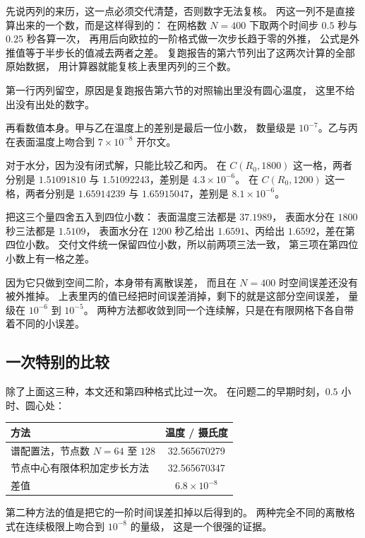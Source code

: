 先说丙列的来历，这一点必须交代清楚，否则数字无法复核。
丙这一列不是直接算出来的一个数，而是这样得到的：
在网格数 $N=400$ 下取两个时间步 $0.5$ 秒与 $0.25$ 秒各算一次，
再用后向欧拉的一阶格式做一次步长趋于零的外推，
公式是外推值等于半步长的值减去两者之差。
复跑报告的第六节列出了这两次计算的全部原始数据，
用计算器就能复核上表里丙列的三个数。

第一行丙列留空，原因是复跑报告第六节的对照输出里没有圆心温度，
这里不给出没有出处的数字。

再看数值本身。甲与乙在温度上的差别是最后一位小数，
数量级是 $10^{-7}$。乙与丙在表面温度上吻合到
$7\times10^{-8}$ 开尔文。

对于水分，因为没有闭式解，只能比较乙和丙。
在 $C(R_0,1800)$ 这一格，两者分别是
$1.51091810$ 与 $1.51092243$，差别是 $4.3\times10^{-6}$。
在 $C(R_0,1200)$ 这一格，两者分别是
$1.65914239$ 与 $1.65915047$，差别是 $8.1\times10^{-6}$。

把这三个量四舍五入到四位小数：
表面温度三法都是 $37.1989$，
表面水分在 $1800$ 秒三法都是 $1.5109$，
表面水分在 $1200$ 秒乙给出 $1.6591$、丙给出 $1.6592$，差在第四位小数。
交付文件统一保留四位小数，所以前两项三法一致，
第三项在第四位小数上有一格之差。

因为它只做到空间二阶，本身带有离散误差，
而且在 $N=400$ 时空间误差还没有被外推掉。
上表里丙的值已经把时间误差消掉，剩下的就是这部分空间误差，
量级在 $10^{-6}$ 到 $10^{-5}$。
两种方法都收敛到同一个连续解，只是在有限网格下各自带着不同的小误差。

\subsection{一次特别的比较}

除了上面这三种，本文还和第四种格式比过一次。
在问题二的早期时刻，$0.5$ 小时、圆心处：

\begin{center}
\begin{tabular}{@{}lc@{}}
\toprule
方法 & 温度 / 摄氏度 \\
\midrule
谱配置法，节点数 $N=64$ 至 $128$ & 32.565670279 \\
节点中心有限体积加定步长方法 & 32.565670347 \\
\midrule
差值 & $6.8\times10^{-8}$ \\
\bottomrule
\end{tabular}
\end{center}

第二种方法的值是把它的一阶时间误差扣掉以后得到的。
两种完全不同的离散格式在连续极限上吻合到 $10^{-8}$ 的量级，
这是一个很强的证据。

